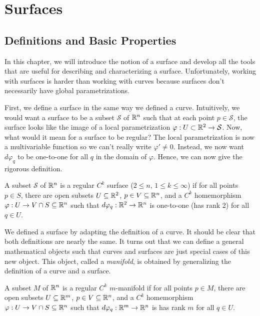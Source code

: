 \section{Surfaces}

\subsection{Definitions and Basic Properties}

In this chapter, we will introduce the notion of a surface and develop all the tools that are useful for describing and characterizing a surface. Unfortunately, working with surfaces is harder than working with curves because surfaces don't necessarily have global parametrizations.

First, we define a surface in the same way we defined a curve. Intuitively, we would want a surface to be a subset $\mathcal{S}$ of $\mathbb{R}^n$ such that at each point $p \in \mathcal{S}$, the surface looks like the image of a local parametrization $\varphi : U \subset \mathbb{R}^2 \to \mathcal{S}$. Now, what would it mean for a surface to be regular? The local parametrization is now a multivariable function so we can't really write $\varphi' \neq 0$. Instead, we now want $d\varphi_q$ to be one-to-one for all $q$ in the domain of $\varphi$. Hence, we can now give the rigorous definition.

\begin{definition}[Surface]
    A subset $\mathcal{S}$ of $\mathbb{R}^n$ is a regular $C^k$ surface ($2 \leq n$, $1 \leq k \leq \infty$) if for all points $p \in S$, there are open subsets $U \subseteq \mathbb{R}^2$, $p \in V \subseteq \mathbb{R}^n$, and a $C^k$ homemorphism $\varphi : U \to V \cap S \subseteq \mathbb{R}^n$ such that $d\varphi_q : \mathbb{R}^2 \to \mathbb{R}^n$ is one-to-one (has rank 2) for all $q \in U$.
\end{definition}

We defined a surface by adapting the definition of a curve. It should be clear that both definitions are nearly the same. It turns out that we can define a general mathematical objects such that curves and surfaces are just special cases of this new object. This object, called a \textit{manifold}, is obtained by generalizing the definition of a curve and a surface.

\begin{definition}[Manifold]
    A subset $M$ of $\mathbb{R}^n$ is a regular $C^k$ $m$-manifold if for all points $p \in M$, there are open subsets $U \subseteq \mathbb{R}^m$, $p \in V \subseteq \mathbb{R}^n$, and a $C^k$ homemorphism $\varphi : U \to V \cap S \subseteq \mathbb{R}^n$ such that $d\varphi_q : \mathbb{R}^m \to \mathbb{R}^n$ is has rank $m$ for all $q \in U$.
\end{definition}

